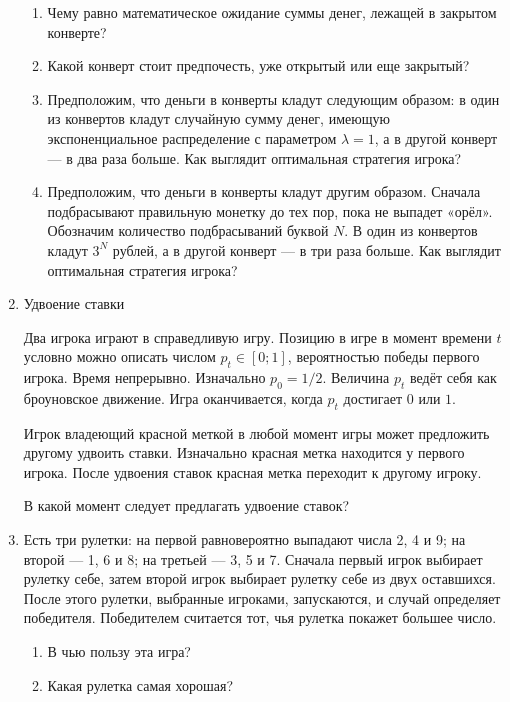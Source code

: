\documentclass[nobib]{tufte-handout}
\begin{document}
\begin{enumerate}
\begin{enumerate}
\item Чему равно математическое ожидание суммы денег, лежащей в закрытом конверте?
\item Какой конверт стоит предпочесть, уже открытый или еще закрытый?
\item Предположим, что деньги в конверты кладут следующим образом: в один из конвертов кладут случайную сумму денег, имеющую экспоненциальное распределение с параметром $\lambda=1$, а в другой конверт --- в два раза больше. Как выглядит оптимальная стратегия игрока?
\item Предположим, что деньги в конверты кладут другим образом. Сначала подбрасывают правильную монетку до тех пор, пока не выпадет «орёл». Обозначим количество подбрасываний буквой $N$. В один из конвертов кладут $3^N$ рублей, а в другой конверт --- в три раза больше. Как выглядит оптимальная стратегия игрока?
\end{enumerate}


\item Удвоение ставки 

Два игрока играют в справедливую игру. Позицию в игре в момент времени $t$ условно можно описать числом $p_t \in [0;1]$, вероятностью победы первого игрока. Время непрерывно. Изначально $p_0=1/2$. Величина $p_t$ ведёт себя как броуновское движение. Игра оканчивается, когда $p_t$ достигает $0$ или $1$. 

Игрок владеющий красной меткой в любой момент игры может предложить другому удвоить ставки. Изначально красная метка находится у первого игрока. После удвоения ставок красная метка переходит к другому игроку.

В какой момент следует предлагать удвоение ставок?

\item Есть три рулетки:  на первой равновероятно выпадают числа 2, 4 и 9; на второй --- 1, 6 и 8; на третьей --- 3, 5 и 7. Сначала первый игрок выбирает рулетку себе, затем второй игрок выбирает рулетку себе из двух оставшихся. После этого рулетки, выбранные игроками, запускаются, и случай определяет победителя. Победителем считается тот, чья рулетка покажет большее число. 

\begin{enumerate}
\item В чью пользу эта игра? 
\item Какая рулетка самая хорошая?
\end{enumerate}


\end{enumerate}
\end{document}
